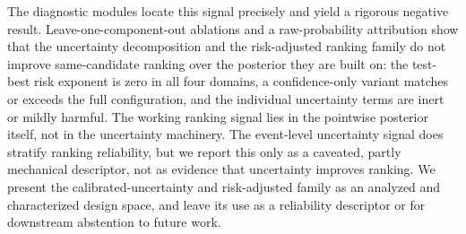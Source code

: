 The diagnostic modules locate this signal precisely and yield a rigorous
negative result. Leave-one-component-out ablations and a raw-probability
attribution show that the uncertainty decomposition and the risk-adjusted
ranking family do not improve same-candidate ranking over the posterior they are
built on: the test-best risk exponent is zero in all four domains, a
confidence-only variant matches or exceeds the full configuration, and the
individual uncertainty terms are inert or mildly harmful. The working ranking
signal lies in the pointwise posterior itself, not in the uncertainty machinery.
The event-level uncertainty signal does stratify ranking reliability, but we
report this only as a caveated, partly mechanical descriptor, not as evidence
that uncertainty improves ranking. We present the calibrated-uncertainty and
risk-adjusted family as an analyzed and characterized design space, and leave
its use as a reliability descriptor or for downstream abstention to future work.
